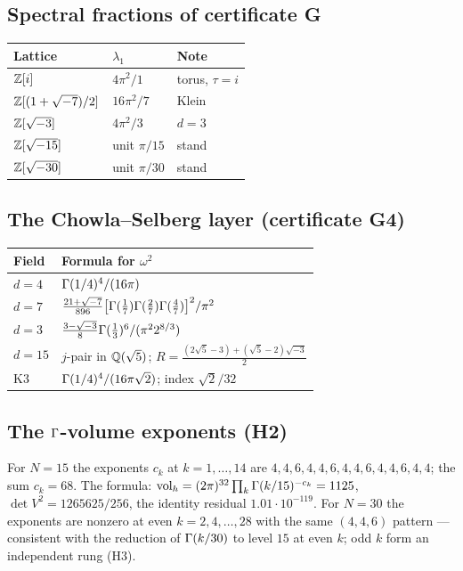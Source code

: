 \subsection{Spectral fractions of certificate G}

\begin{center}
\small
\begin{tabular}{@{}l l l@{}}
\toprule
Lattice & $\lambda_1$ & Note \\
\midrule
$\mathbb{Z}[i]$ & $4\pi^2/1$ & torus, $\tau=i$ \\
$\mathbb{Z}[(1+\sqrt{-7})/2]$ & $16\pi^2/7$ & Klein \\
$\mathbb{Z}[\sqrt{-3}]$ & $4\pi^2/3$ & $d=3$ \\
$\mathbb{Z}[\sqrt{-15}]$ & unit $\pi/15$ & stand \\
$\mathbb{Z}[\sqrt{-30}]$ & unit $\pi/30$ & stand \\
\bottomrule
\end{tabular}
\end{center}

\subsection{The Chowla--Selberg layer (certificate G4)}

\begin{center}
\small
\begin{tabular}{@{}l l@{}}
\toprule
Field & Formula for $\omega^2$ \\
\midrule
$d=4$ & $\Gamma(1/4)^4/(16\pi)$ \\
$d=7$ & $\tfrac{21+\sqrt{-7}}{896}
  \bigl[\Gamma(\tfrac17)\Gamma(\tfrac27)\Gamma(\tfrac47)\bigr]^2/\pi^2$ \\
$d=3$ & $\tfrac{3-\sqrt{-3}}{8}\Gamma(\tfrac13)^6/(\pi^2 2^{8/3})$ \\
$d=15$ & $j$-pair in $\mathbb{Q}(\sqrt5)$;
  $R=\tfrac{(2\sqrt5-3)+(\sqrt5-2)\sqrt{-3}}2$ \\
K3 & $\Gamma(1/4)^4/(16\pi\sqrt2)$; index $\sqrt2/32$ \\
\bottomrule
\end{tabular}
\end{center}

\subsection{The $\Gamma$-volume exponents (H2)}

For $N=15$ the exponents $c_k$ at $k=1,\dots,14$ are
$4,4,6,4,4,6,4,4,6,4,4,6,4,4$; the sum $c_k=68$. The formula:
$\mathrm{vol}_h=(2\pi)^{32}\prod_k\Gamma(k/15)^{-c_k}=1125$,
$\det V^2=1265625/256$, the identity residual $1.01\cdot10^{-119}$.
For $N=30$ the exponents are nonzero at even $k=2,4,\dots,28$ with
the same $(4,4,6)$ pattern --- consistent with the reduction of
$\Gamma(k/30)$ to level $15$ at even $k$; odd $k$ form an independent
rung (H3).

